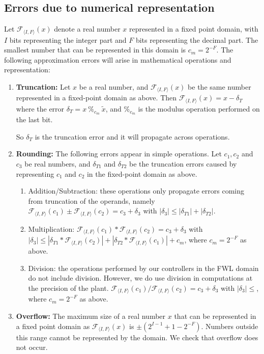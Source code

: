 \documentclass[runningheads,a4paper]{llncs}
\begin{document}
\subsection{Errors due to numerical representation} \label{appendix:numerical_errors}

Let $\mathcal{F}_{\langle I,F \rangle}(x)$ denote a real number $x$ represented in a fixed point domain, with $I$ bits representing the integer part and $F$ bits representing the decimal part. The smallest number that can be represented in this domain is $c_m=2^{-F}$.
The following approximation errors will arise in mathematical operations and representation:
\begin{enumerate}
\item {\bf Truncation:}
Let $x$ be a real number, and $\mathcal{F}_{\langle I,F \rangle}(x)$ be the same number represented in a fixed-point domain as above. 
Then $\mathcal{F}_{\langle I,F \rangle}(x) = x-\delta_T$ where the error $ \delta_T=x\ \%_{c_m}\ \tilde x$, and $\%_{c_m}$ is the modulus operation performed on the last bit.

So $\delta_T$ is the truncation error and it will propagate across operations.
\item {\bf Rounding:}
The following errors appear in simple operations. Let $c_1, c_2$ and $c_3$ be real numbers, and $\delta_{T1}$ and $\delta_{T2}$ be the truncation errors caused by representing $c_1$ and $c_2$ in the fixed-point domain as above.
\begin{enumerate}
\item Addition/Subtraction: these operations only propagate errors coming from truncation of the operands, namely 
$\mathcal{F}_{\langle I,F \rangle}(c_1) \pm \mathcal{F}_{\langle I,F \rangle}(c_2) = c_3 + \delta_3$ with $|\delta_3| \leq |\delta_{T1}| + |\delta_{T2}|$.
\item Multiplication: $\mathcal{F}_{\langle I,F \rangle}(c_1) * \mathcal{F}_{\langle I,F \rangle}(c_2) =  c_3 + \delta_3$ with $|\delta_3| \leq |\delta_{T1}*\mathcal{F}_{\langle I,F \rangle}(c_2)| + |\delta_{T2}*\mathcal{F}_{\langle I,F \rangle}(c_1)| + c_m$, where $c_m=2^{-F}$ as above.
\item Division: the operations performed by our controllers in the FWL domain do not include division. However, we do use division in computations at the precision of the plant. $\mathcal{F}_{\langle I,F \rangle}(c_1) / \mathcal{F}_{\langle I,F \rangle}(c_2) =  c_3 + \delta_3$ with $|\delta_3| \leq $, where $c_m=2^{-F}$ as above.
\end{enumerate}

\item {\bf Overflow:}
The maximum size of a real number $x$ that can be represented in a fixed point domain as $\mathcal{F}_{\langle I,F \rangle}(x)$ is $\pm (2^{I-1}+1-2^{-F})$. Numbers outside this range cannot be represented by the domain. We check that overflow does not occur.

\end{enumerate}
\end{document}

